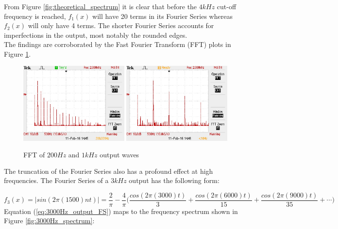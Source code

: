 \documentclass{article}
\begin{document}
From Figure \ref{fig:theoretical_spectrum} it is clear that before the $4kHz$ cut-off frequency is reached, $f_{1}(x)$ will have 20 terms in its Fourier Series whereas $f_{2}(x)$ will only have 4 terms. The shorter Fourier Series accounts for imperfections in the output, most notably the rounded edges.\\

The findings are corroborated by the Fast Fourier Transform (FFT) plots in Figure \ref{fig:compare_output_fft_pranav}.

\begin{figure}[H]
    \centering
    \includegraphics[width=0.49\textwidth]{ex1_200Hz_output_2_FFT.JPG}
    \includegraphics[width=0.49\textwidth]{ex1_1000Hz_output_FFT.JPG}
    \caption{FFT of $200Hz$ and $1kHz$ output waves}
    \label{fig:compare_output_fft_pranav}
\end{figure}

The truncation of the Fourier Series also has a profound effect at high frequencies. The Fourier Series of a $3kHz$ output has the following form:

\begin{equation}\label{eq:3000Hz_output_FS}
    f_{3}(x) = |sin(2\pi (1500)nt)| = \frac{2}{\pi}-\frac{4}{\pi}\Bigg(\frac{cos(2\pi (3000)t)}{3}+\frac{cos(2\pi (6000)t)}{15} + \frac{cos(2\pi (9000)t)}{35} + \cdots\Bigg)
\end{equation}
\newpage
Equation (\ref{eq:3000Hz_output_FS}) maps to the frequency spectrum shown in Figure \ref{fig:3000Hz_spectrum}:
\end{document}
